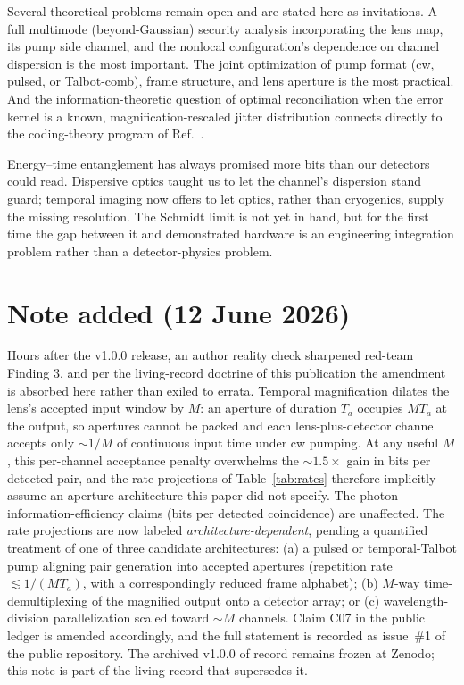 \documentclass[11pt]{article}
\begin{document}
Several theoretical problems remain open and are stated here as invitations. A full multimode (beyond-Gaussian) security analysis incorporating the lens map, its pump side channel, and the nonlocal configuration's dependence on channel dispersion is the most important. The joint optimization of pump format (cw, pulsed, or Talbot-comb), frame structure, and lens aperture is the most practical. And the information-theoretic question of optimal reconciliation when the error kernel is a known, magnification-rescaled jitter distribution connects directly to the coding-theory program of Ref.~\cite{Boutros2023}.

Energy--time entanglement has always promised more bits than our detectors could read. Dispersive optics taught us to let the channel's dispersion stand guard; temporal imaging now offers to let optics, rather than cryogenics, supply the missing resolution. The Schmidt limit is not yet in hand, but for the first time the gap between it and demonstrated hardware is an engineering integration problem rather than a detector-physics problem.

\section*{Note added (12 June 2026)}
Hours after the v1.0.0 release, an author reality check sharpened red-team Finding 3, and per the living-record doctrine of this publication the amendment is absorbed here rather than exiled to errata. Temporal magnification dilates the lens's accepted input window by $M$: an aperture of duration $T_a$ occupies $M T_a$ at the output, so apertures cannot be packed and each lens-plus-detector channel accepts only $\sim 1/M$ of continuous input time under cw pumping. At any useful $M$, this per-channel acceptance penalty overwhelms the $\sim 1.5\times$ gain in bits per detected pair, and the rate projections of Table~\ref{tab:rates} therefore implicitly assume an aperture architecture this paper did not specify. The photon-information-efficiency claims (bits per detected coincidence) are unaffected. The rate projections are now labeled \emph{architecture-dependent}, pending a quantified treatment of one of three candidate architectures: (a) a pulsed or temporal-Talbot pump aligning pair generation into accepted apertures (repetition rate $\lesssim 1/(M T_a)$, with a correspondingly reduced frame alphabet); (b) $M$-way time-demultiplexing of the magnified output onto a detector array; or (c) wavelength-division parallelization scaled toward $\sim M$ channels. Claim C07 in the public ledger is amended accordingly, and the full statement is recorded as issue~\#1 of the public repository. The archived v1.0.0 of record remains frozen at Zenodo; this note is part of the living record that supersedes it.
\end{document}
